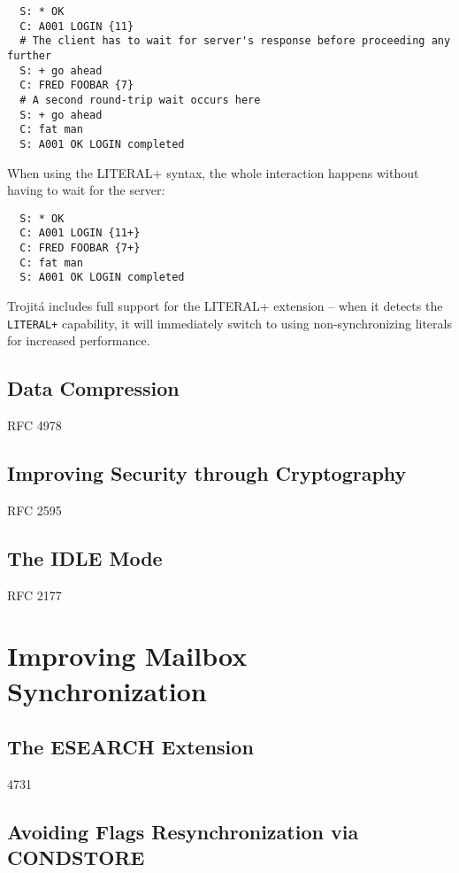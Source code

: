 \documentclass[trojita]{subfiles}
\begin{document}
\begin{verbatim}
  S: * OK
  C: A001 LOGIN {11}
  # The client has to wait for server's response before proceeding any further
  S: + go ahead
  C: FRED FOOBAR {7}
  # A second round-trip wait occurs here
  S: + go ahead
  C: fat man
  S: A001 OK LOGIN completed
\end{verbatim}

When using the LITERAL+ syntax, the whole interaction happens without having to wait for the server:

\begin{verbatim}
  S: * OK
  C: A001 LOGIN {11+}
  C: FRED FOOBAR {7+}
  C: fat man
  S: A001 OK LOGIN completed
\end{verbatim}

Trojitá includes full support for the LITERAL+ extension -- when it detects the {\tt LITERAL+} capability, it will
immediately switch to using non-synchronizing literals for increased performance.

\subsection{Data Compression}

RFC 4978

\subsection{Improving Security through Cryptography}

RFC 2595

\subsection{The IDLE Mode}

RFC 2177

\section{Improving Mailbox Synchronization}

\subsection{The ESEARCH Extension}

4731

\subsection{Avoiding Flags Resynchronization via CONDSTORE}
\end{document}
